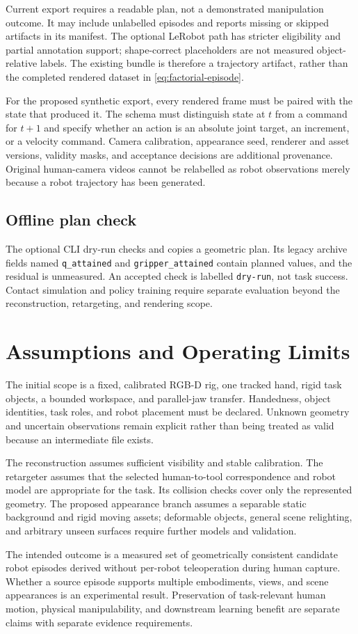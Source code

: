 Current export requires a readable plan, not a demonstrated manipulation
outcome. It may include unlabelled episodes and reports missing or skipped
artifacts in its manifest. The optional LeRobot path has stricter
eligibility and partial annotation support; shape-correct placeholders
are not measured object-relative labels. The existing bundle is therefore
a trajectory artifact, rather than the completed rendered dataset in
\eqref{eq:factorial-episode}.

For the proposed synthetic export, every rendered frame must be paired
with the state that produced it. The schema must distinguish state at
$t$ from a command for $t+1$ and specify whether an action is an absolute
joint target, an increment, or a velocity command. Camera calibration,
appearance seed, renderer and asset versions, validity masks, and
acceptance decisions are additional provenance. Original human-camera
videos cannot be relabelled as robot observations merely because a robot
trajectory has been generated.

\subsection{Offline plan check}
\label{sec:replay}

The optional CLI dry-run checks and copies a geometric plan. Its legacy
archive fields named \texttt{q\_attained} and
\texttt{gripper\_attained} contain planned values, and the residual is
unmeasured. An accepted check is labelled \texttt{dry-run}, not task success.
Contact simulation and policy training require separate evaluation beyond
the reconstruction, retargeting, and rendering scope.

\section{Assumptions and Operating Limits}
\label{sec:assumptions}

The initial scope is a fixed, calibrated RGB-D rig, one tracked hand,
rigid task objects, a bounded workspace, and parallel-jaw transfer.
Handedness, object identities, task roles, and robot placement must be
declared. Unknown geometry and uncertain observations remain explicit
rather than being treated as valid because an intermediate file exists.

The reconstruction assumes sufficient visibility and stable calibration.
The retargeter assumes that the selected human-to-tool correspondence and
robot model are appropriate for the task. Its collision checks cover only
the represented geometry. The proposed appearance branch assumes a
separable static background and rigid moving assets; deformable objects,
general scene relighting, and arbitrary unseen surfaces require further
models and validation.

The intended outcome is a measured set of geometrically consistent
candidate robot episodes derived without per-robot teleoperation during
human capture. Whether a source episode supports multiple embodiments,
views, and scene appearances is an experimental result. Preservation of
task-relevant human motion, physical manipulability, and downstream
learning benefit are separate claims with separate evidence requirements.